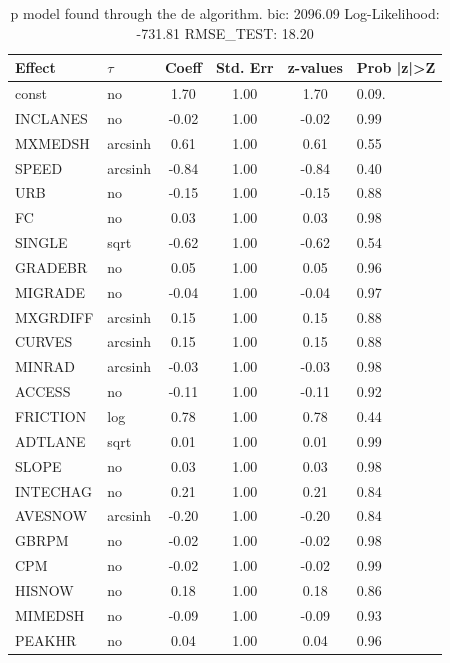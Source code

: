 \begin{table}
	\caption{p model found through the de algorithm. bic: 2096.09 Log-Likelihood: -731.81 RMSE_TEST: 18.20}
	\begin{center}
		\begin{tabular}{|l|l|c|c|c|l|}
			\hline
			Effect & $\tau$ & Coeff & Std. Err & z-values & Prob |z|>Z \\
			\hline
			const & no & 1.70 & 1.00 & 1.70 & 0.09. \\
			\hline
			INCLANES & no & -0.02 & 1.00 & -0.02 & 0.99 \\
			\hline
			MXMEDSH & arcsinh & 0.61 & 1.00 & 0.61 & 0.55 \\
			\hline
			SPEED & arcsinh & -0.84 & 1.00 & -0.84 & 0.40 \\
			\hline
			URB & no & -0.15 & 1.00 & -0.15 & 0.88 \\
			\hline
			FC & no & 0.03 & 1.00 & 0.03 & 0.98 \\
			\hline
			SINGLE & sqrt & -0.62 & 1.00 & -0.62 & 0.54 \\
			\hline
			GRADEBR & no & 0.05 & 1.00 & 0.05 & 0.96 \\
			\hline
			MIGRADE & no & -0.04 & 1.00 & -0.04 & 0.97 \\
			\hline
			MXGRDIFF & arcsinh & 0.15 & 1.00 & 0.15 & 0.88 \\
			\hline
			CURVES & arcsinh & 0.15 & 1.00 & 0.15 & 0.88 \\
			\hline
			MINRAD & arcsinh & -0.03 & 1.00 & -0.03 & 0.98 \\
			\hline
			ACCESS & no & -0.11 & 1.00 & -0.11 & 0.92 \\
			\hline
			FRICTION & log & 0.78 & 1.00 & 0.78 & 0.44 \\
			\hline
			ADTLANE & sqrt & 0.01 & 1.00 & 0.01 & 0.99 \\
			\hline
			SLOPE & no & 0.03 & 1.00 & 0.03 & 0.98 \\
			\hline
			INTECHAG & no & 0.21 & 1.00 & 0.21 & 0.84 \\
			\hline
			AVESNOW & arcsinh & -0.20 & 1.00 & -0.20 & 0.84 \\
			\hline
			GBRPM & no & -0.02 & 1.00 & -0.02 & 0.98 \\
			\hline
			CPM & no & -0.02 & 1.00 & -0.02 & 0.99 \\
			\hline
			HISNOW & no & 0.18 & 1.00 & 0.18 & 0.86 \\
			\hline
			MIMEDSH & no & -0.09 & 1.00 & -0.09 & 0.93 \\
			\hline
			PEAKHR & no & 0.04 & 1.00 & 0.04 & 0.96 \\

\end{tabular}
\end{center}
\end{table}
